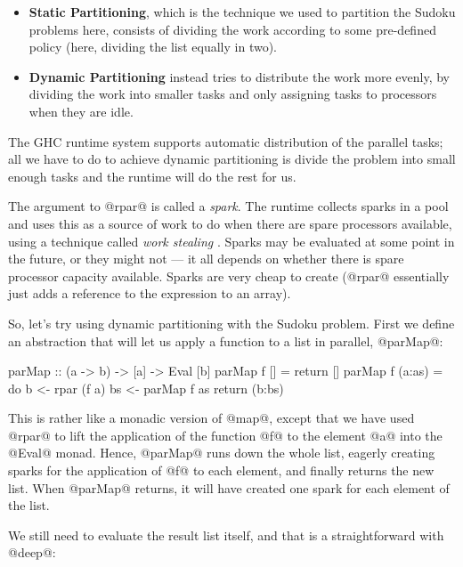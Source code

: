 \begin{itemize}
\item \textbf{Static Partitioning}, which is the technique we used to
  partition the Sudoku problems here, consists of dividing the work
  according to some pre-defined policy (here, dividing the list
  equally in two).

\item \textbf{Dynamic Partitioning} instead tries to distribute the
  work more evenly, by dividing the work into smaller tasks and only
  assigning tasks to processors when they are idle.
\end{itemize}

The GHC runtime system supports automatic distribution of the parallel
tasks; all we have to do to achieve dynamic partitioning is divide the
problem into small enough tasks and the runtime will do the rest for
us.

The argument to @rpar@ is called a \emph{spark}.  The runtime collects
sparks in a pool and uses this as a source of work to do when there
are spare processors available, using a technique called \emph{work
  stealing} \cite{multicore-ghc-09}.  Sparks may be evaluated at some
point in the future, or they might not --- it all depends on whether
there is spare processor capacity available.  Sparks are very cheap to
create (@rpar@ essentially just adds a reference to the expression to
an array).

So, let's try using dynamic partitioning with the Sudoku problem.
First we define an abstraction that will let us apply a function to a
list in parallel, @parMap@:

\begin{numhaskell}
parMap :: (a -> b) -> [a] -> Eval [b]
parMap f [] = return []
parMap f (a:as) = do
   b <- rpar (f a)
   bs <- parMap f as
   return (b:bs)
\end{numhaskell}

\noindent This is rather like a monadic version of @map@, except that
we have used @rpar@ to lift the application of the function @f@ to the
element @a@ into the @Eval@ monad.  Hence, @parMap@ runs down the
whole list, eagerly creating sparks for the application of @f@ to each
element, and finally returns the new list.  When @parMap@ returns, it
will have created one spark for each element of the list.

We still need to evaluate the result list itself, and that is a
straightforward with @deep@:


